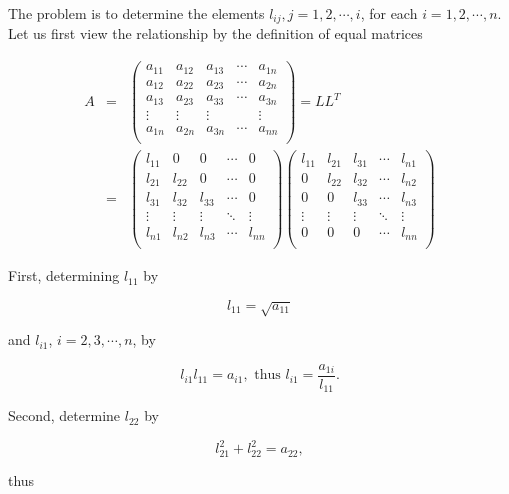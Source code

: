 \documentclass[preprint,12pt]{elsarticle}
\begin{document}
The problem is to determine the elements $l_{ij},j=1,2,\cdots,i$, for each $i=1,2,\cdots,n$. Let us first view the relationship by the definition of equal matrices

\begin{eqnarray*}
A&=&\left(
    \begin{array}{ccccc}
      a_{11} & a_{12} & a_{13} & \cdots & a_{1n} \\
      a_{12} & a_{22} & a_{23} & \cdots & a_{2n} \\
      a_{13} & a_{23} & a_{33} & \cdots & a_{3n} \\
      \vdots & \vdots & \vdots &  & \vdots \\
      a_{1n} & a_{2n} & a_{3n} & \cdots & a_{nn} \\
    \end{array}
  \right)=LL^T\\
  &=&\left(%
\begin{array}{ccccc}
  l_{11} & 0 & 0& \cdots & 0 \\
  l_{21} & l_{22} & 0 & \cdots& 0 \\
  l_{31} & l_{32} & l_{33} & \cdots & 0 \\
  \vdots & \vdots & \vdots &\ddots & \vdots \\
  l_{n1} & l_{n2} & l_{n3} & \cdots & l_{nn} \\
\end{array}%
\right)
\left(%
\begin{array}{ccccc}
  l_{11} & l_{21} & l_{31}& \cdots & l_{n1} \\
  0 & l_{22} & l_{32} & \cdots& l_{n2} \\
  0 & 0 & l_{33} & \cdots & l_{n3} \\
  \vdots & \vdots & \vdots &\ddots & \vdots \\
  0 & 0 & 0 & \cdots & l_{nn} \\
\end{array}%
\right)
\end{eqnarray*}

First, determining $l_{11}$ by

\[
l_{11}=\sqrt{a_{11}}
\]

and $l_{i1}$, $i=2,3,\cdots,n$, by

\[
l_{i1}l_{11}=a_{i1}, \text{ thus }
l_{i1}=\frac{a_{1i}}{l_{11}}.
\]

Second, determine $l_{22}$ by

\[
l_{21}^2+l_{22}^2=a_{22},
\]

thus
\end{document}
